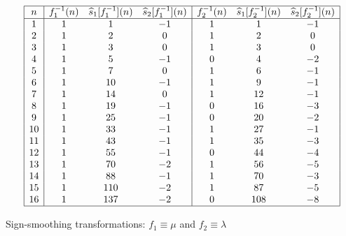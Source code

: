 \documentclass[12pt,reqno,a4letter]{article}
\numberwithin{figure}{section}
\numberwithin{table}{section}
\numberwithin{equation}{section}
\theoremstyle{plain}
\numberwithin{theorem}{section}
\theoremstyle{definition}
\begin{document}
\begin{table}[h!]
\begin{equation*}
\begin{array}{|c|ccc|ccc|} 
 \hline
 n & f_1^{-1}(n) & \widehat{s}_1[f_1^{-1}](n) & \widehat{s}_2[f_1^{-1}](n) & 
     f_2^{-1}(n) & \widehat{s}_1[f_2^{-1}](n) & 
     \widehat{s}_2[f_2^{-1}](n) \\ \hline
 1 & 1 & 1 & -1 & 1 & 1 & -1 \\
 2 & 1 & 2 & 0 & 1 & 2 & 0 \\
 3 & 1 & 3 & 0 & 1 & 3 & 0 \\
 4 & 1 & 5 & -1 & 0 & 4 & -2 \\
 5 & 1 & 7 & 0 & 1 & 6 & -1 \\
 6 & 1 & 10 & -1 & 1 & 9 & -1 \\
 7 & 1 & 14 & 0 & 1 & 12 & -1 \\
 8 & 1 & 19 & -1 & 0 & 16 & -3 \\
 9 & 1 & 25 & -1 & 0 & 20 & -2 \\
 10 & 1 & 33 & -1 & 1 & 27 & -1 \\
 11 & 1 & 43 & -1 & 1 & 35 & -3 \\
 12 & 1 & 55 & -1 & 0 & 44 & -4 \\
 13 & 1 & 70 & -2 & 1 & 56 & -5 \\
 14 & 1 & 88 & -1 & 1 & 70 & -3 \\
 15 & 1 & 110 & -2 & 1 & 87 & -5 \\
 16 & 1 & 137 & -2 & 0 & 108 & -8 \\
 \hline
\end{array}
\end{equation*}
\caption{Sign-smoothing transformations: $f_1 \equiv \mu$ and $f_2 \equiv \lambda$}
\label{table_s12fn_SignSmoothingTF_v5}
\end{table}
\end{document}

